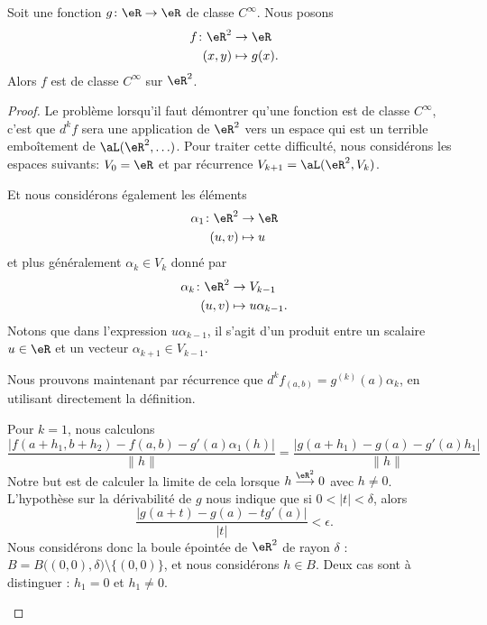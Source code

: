 \begin{lemma}       \label{LEMooDDUZooLwXkRp}
	Soit une fonction \( g\colon \eR\to \eR\) de classe \(  C^{\infty}\). Nous posons
	\begin{equation}
		\begin{aligned}
			f\colon \eR^2 & \to \eR       \\
			(x,y)         & \mapsto g(x).
		\end{aligned}
	\end{equation}
	Alors \( f\) est de classe \(  C^{\infty}\) sur \( \eR^2\).
\end{lemma}

\begin{proof}
	Le problème lorsqu'il faut démontrer qu'une fonction est de classe \(  C^{\infty}\), c'est que \( d^kf\) sera une application de \( \eR^2\) vers un espace qui est un terrible emboîtement de \( \aL(\eR^2,\ldots)\). Pour traiter cette difficulté, nous considérons les espaces suivants: \( V_0=\eR\) et par récurrence \( V_{k+1}=\aL(\eR^2,V_k)\).

	Et nous considérons également les éléments
	\begin{equation}
		\begin{aligned}
			\alpha_1\colon \eR^2 & \to \eR   \\
			(u,v)                & \mapsto u
		\end{aligned}
	\end{equation}
	et plus généralement \( \alpha_k\in V_k\) donné par
	\begin{equation}
		\begin{aligned}
			\alpha_k\colon \eR^2 & \to V_{k-1}            \\
			(u,v)                & \mapsto u\alpha_{k-1}.
		\end{aligned}
	\end{equation}
	Notons que dans l'expression \( u\alpha_{k-1}\), il s'agit d'un produit entre un scalaire \( u\in \eR\) et un vecteur \( \alpha_{k+1}\in V_{k-1}\).

	Nous prouvons maintenant par récurrence que \( d^{k}f_{(a,b)}=g^{(k)}(a)\alpha_k\), en utilisant directement la définition.

	\begin{subproof}
		\spitem[Initialisation]

		Pour \( k=1\), nous calculons
		\begin{equation}
			\frac{ |f(a+h_1,b+h_2)-f(a,b)-g'(a)\alpha_1(h)| }{ \| h \| }=\frac{ |g(a+h_1)-g(a)-g'(a)h_1| }{ \| h \| }
		\end{equation}
		Notre but est de calculer la limite de cela lorsque \( h\stackrel{\eR^2}{\longrightarrow}0\) avec \( h\neq 0\). L'hypothèse sur la dérivabilité de \( g\) nous indique que si \( 0<| t |<\delta\), alors
		\begin{equation}        \label{EQooQLWNooLRKhUv}
			\frac{ | g(a+t)-g(a)-tg'(a) | }{ | t | }<\epsilon.
		\end{equation}
		Nous considérons donc la boule épointée de \( \eR^2\) de rayon \( \delta\) : \( B=B\big( (0,0),\delta \big)\setminus\{(0,0)\}\), et nous considérons \( h\in B\). Deux cas sont à distinguer : \( h_1=0\) et \( h_1\neq 0\).


\end{subproof}
\end{proof}
